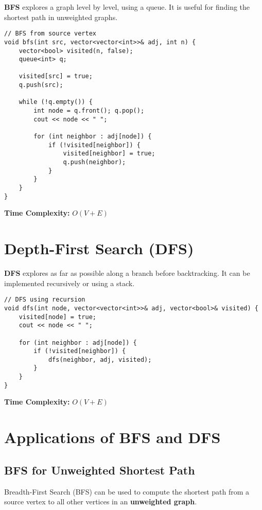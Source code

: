 \documentclass{article}
\begin{document}
\textbf{BFS} explores a graph level by level, using a queue. It is useful for finding the shortest path in unweighted graphs.

\begin{lstlisting}[style=cppstyle]
// BFS from source vertex
void bfs(int src, vector<vector<int>>& adj, int n) {
    vector<bool> visited(n, false);
    queue<int> q;
    
    visited[src] = true;
    q.push(src);

    while (!q.empty()) {
        int node = q.front(); q.pop();
        cout << node << " ";

        for (int neighbor : adj[node]) {
            if (!visited[neighbor]) {
                visited[neighbor] = true;
                q.push(neighbor);
            }
        }
    }
}
\end{lstlisting}

\textbf{Time Complexity:} $O(V + E)$

\section{Depth-First Search (DFS)}

\textbf{DFS} explores as far as possible along a branch before backtracking. It can be implemented recursively or using a stack.

\begin{lstlisting}[style=cppstyle]
// DFS using recursion
void dfs(int node, vector<vector<int>>& adj, vector<bool>& visited) {
    visited[node] = true;
    cout << node << " ";

    for (int neighbor : adj[node]) {
        if (!visited[neighbor]) {
            dfs(neighbor, adj, visited);
        }
    }
}
\end{lstlisting}

\textbf{Time Complexity:} $O(V + E)$

\section{Applications of BFS and DFS}

\subsection{BFS for Unweighted Shortest Path}

Breadth-First Search (BFS) can be used to compute the shortest path from a source vertex to all other vertices in an \textbf{unweighted graph}.
\end{document}
